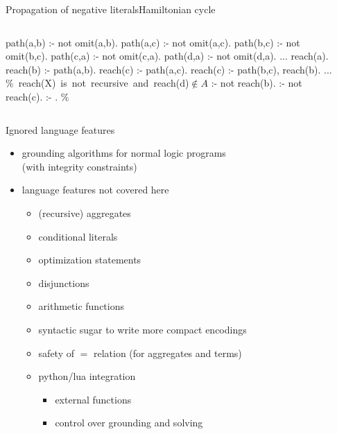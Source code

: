 \begin{frame}{Propagation of negative literals}{Hamiltonian cycle}
  \begin{columns}
    \begin{column}{0.45\textwidth}
    \begin{minipage}{.4\textwidth}
      \begin{semiverbatim}
path(a,b) :- not omit(a,b).
path(a,c) :- not omit(a,c).
path(b,c) :- not omit(b,c).
path(c,a) :- not omit(c,a).
path(d,a) :- not omit(d,a).
...
\alert{reach(a)}.
\alert{reach(b)} :- path(a,b).
\alert{reach(c)} :- path(a,c).
\alert{reach(c)} :- path(b,c), reach(b).
...
\mbox{{\color{comment}\% reach(X) is not recursive and reach(d)\({}\not\in{}A\)}}
:- not reach(b).
:- not reach(c).
:- . \color{comment}\% 
      \end{semiverbatim}
    \end{minipage}
    \end{column}
    \begin{column}[t]{0.45\textwidth}
      \centering
      \Graph[draw=none]
    \end{column}
  \end{columns}
\end{frame}
\begin{frame}{Ignored language features}
  \bigskip
  \begin{itemize}
    \item grounding algorithms for normal logic programs\\(with integrity constraints)
    \item language features not covered here
      \begin{itemize}
        \item (recursive) aggregates
        \item conditional literals
        \item optimization statements
        \item disjunctions
        \item arithmetic functions
        \item syntactic sugar to write more compact encodings
        \item safety of \(=\) relation (for aggregates and terms)
        \item python/lua integration
          \begin{itemize}
            \item external functions
            \item control over grounding and solving
          \end{itemize}
      \end{itemize}
  \end{itemize}
\end{frame}
%
